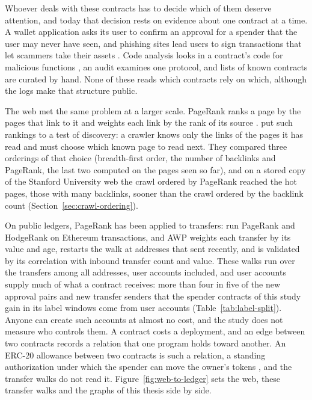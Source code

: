 Whoever deals with these contracts has to decide which of them deserve attention, and today that decision rests on evidence about one contract at a time. A wallet application asks its user to confirm an approval for a spender that the user may never have seen, and phishing sites lead users to sign transactions that let scammers take their assets \parencite{he2023txphishscope}. Code analysis looks in a contract's code for malicious functions \parencite{lin2024crpwarner}, an audit examines one protocol, and lists of known contracts are curated by hand. None of these reads which contracts rely on which, although the logs make that structure public.

The web met the same problem at a larger scale. PageRank ranks a page by the pages that link to it and weights each link by the rank of its source \parencite{page1999pagerank}. \textcite{cho1998crawling} put such rankings to a test of discovery: a crawler knows only the links of the pages it has read and must choose which known page to read next. They compared three orderings of that choice (breadth-first order, the number of backlinks and PageRank, the last two computed on the pages seen so far), and on a stored copy of the Stanford University web the crawl ordered by PageRank reached the hot pages, those with many backlinks, sooner than the crawl ordered by the backlink count (Section~\ref{sec:crawl-ordering}).

On public ledgers, PageRank has been applied to transfers: \textcite{do2023hodgerank} run PageRank and HodgeRank on Ethereum transactions, and AWP \parencite{do2023awp} weights each transfer by its value and age, restarts the walk at addresses that sent recently, and is validated by its correlation with inbound transfer count and value. These walks run over the transfers among all addresses, user accounts included, and user accounts supply much of what a contract receives: more than four in five of the new approval pairs and new transfer senders that the spender contracts of this study gain in its label windows come from user accounts (Table~\ref{tab:label-split}). Anyone can create such accounts at almost no cost, and the study does not measure who controls them. A contract costs a deployment, and an edge between two contracts records a relation that one program holds toward another. An ERC-20 allowance between two contracts is such a relation, a standing authorization under which the spender can move the owner's tokens \parencite{vogelsteller2015erc20}, and the transfer walks do not read it. Figure~\ref{fig:web-to-ledger} sets the web, these transfer walks and the graphs of this thesis side by side.

